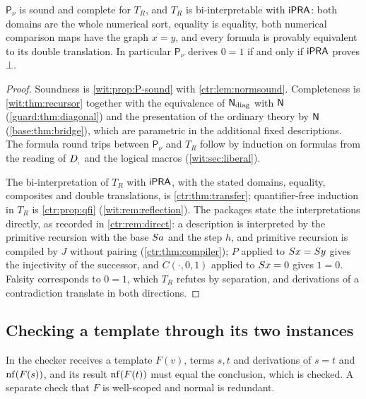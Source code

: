 \begin{theorem}
\label{wit:thm:recursor-bi}
$\mathsf{P}_{\nu}$ is sound and complete for $T_R$, and $T_R$ is
bi-interpretable with $\mathsf{iPRA}$: both domains are the whole numerical sort,
equality is equality, both numerical comparison maps have the graph $x=y$,
and every formula is provably equivalent to its double translation.  In
particular $\mathsf{P}_{\nu}$ derives $0=1$ if and only if $\mathsf{iPRA}$ proves
$\bot$.
\end{theorem}

\begin{proof}
Soundness is \cref{wit:prop:P-sound} with \cref{ctr:lem:normsound}.
Completeness is \cref{wit:thm:recursor} together with the equivalence of
$\mathsf{N}_{\mathrm{diag}}$ with $\mathsf{N}$ (\cref{guard:thm:diagonal}) and the
presentation of the ordinary theory by $\mathsf{N}$ (\cref{base:thm:bridge}),
which are parametric in the additional fixed descriptions.  The formula
round trips between $\mathsf{P}_{\nu}$ and $T_R$ follow by induction on
formulas from the reading of $D_{,}$ and the logical macros
(\cref{wit:sec:liberal}).

The bi-interpretation of $T_R$ with $\mathsf{iPRA}$, with the stated domains,
equality, composites and double translations, is \cref{ctr:thm:transfer};
quantifier-free induction in $T_R$ is \cref{ctr:prop:qfi}
(\cref{wit:rem:reflection}).  The packages state the interpretations
directly, as recorded in \cref{ctr:rem:direct}: a description is
interpreted by the primitive recursion with the base $S a$ and the step
$h$, and primitive recursion is compiled by $J$ without pairing
(\cref{ctr:thm:compiler}); $P$ applied to $S x=S y$ gives the
injectivity of the successor, and $C(\cdot,0,1)$ applied to $S x=0$
gives $1=0$.  Falsity corresponds to $0=1$, which $T_R$ refutes by
separation, and derivations of a contradiction translate in both
directions.
\end{proof}

\subsection{Checking a template through its two instances}

In  the checker receives a template $F(v)$, terms $s,t$
and derivations of $s=t$ and $\operatorname{nf}(F(s))$, and its result $\operatorname{nf}(F(t))$ must
equal the conclusion, which is checked.  A separate check that $F$ is
well-scoped and normal is redundant.

